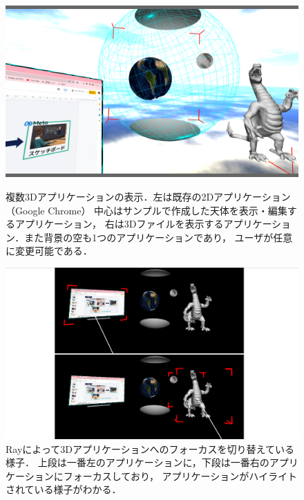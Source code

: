 \begin{figure}[htbp]
  \begin{minipage}[t]{0.50\linewidth}
    \centering
    \includegraphics[keepaspectratio, width=\linewidth]{fig/multi-app.png}
    \caption{
      複数3Dアプリケーションの表示．左は既存の2Dアプリケーション（Google Chrome）
      中心はサンプルで作成した天体を表示・編集するアプリケーション，
      右は3Dファイルを表示するアプリケーション．また背景の空も1つのアプリケーションであり，
      ユーザが任意に変更可能である．
    }
    \label{fig:multi-app}
  \end{minipage}
  \begin{minipage}[t]{0.50\linewidth}
    \centering
    \includegraphics[keepaspectratio, width=\linewidth]{fig/ray-input.png}
    \caption{
      Rayによって3Dアプリケーションへのフォーカスを切り替えている様子．
      上段は一番左のアプリケーションに，下段は一番右のアプリケーションにフォーカスしており，
      アプリケーションがハイライトされている様子がわかる．
    }
    \label{fig:ray-input}
  \end{minipage}
\end{figure}

